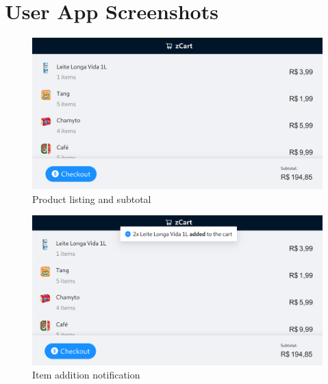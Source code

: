 
\chapter{User App Screenshots}\label{ap:userapp}

\begin{figure}[H]
	\centering
	\caption[Product listing and subtotal]{Product listing and subtotal}
	\includegraphics[width=1\textwidth]{./images/userapp.png}
    \fonte{}
\end{figure}

\begin{figure}[H]
	\centering
	\caption[Item addition notification]{Item addition notification}
	\includegraphics[width=1\textwidth]{./images/userapp2.png}
    \fonte{}
\end{figure}

